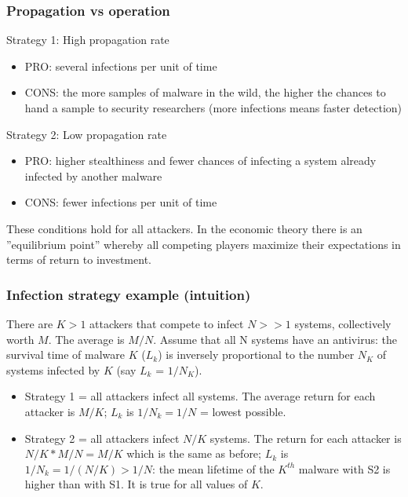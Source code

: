 \documentclass[a4paper, 10pt, titlepage]{article}
\begin{document}
\subsubsection*{Propagation vs operation}
Strategy 1: High propagation rate
\begin{itemize}
	\item PRO: several infections per unit of time
	\item CONS: the more samples of malware in the wild, the higher the
	chances to hand a sample to security researchers (more infections means faster detection)
\end{itemize}
Strategy 2: Low propagation rate
\begin{itemize}
	\item PRO: higher stealthiness and fewer chances of infecting a system already infected by another malware
	\item CONS: fewer infections per unit of time
\end{itemize}
These conditions hold for all attackers. In the economic theory there is an ”equilibrium point” whereby all competing players maximize their expectations in terms of return to investment.

\subsubsection*{Infection strategy example (intuition)}
There are $K>1$ attackers that compete to infect $N>>1$ systems, collectively worth $M$. The average is $M/N$. Assume that all N systems have an antivirus: the survival time of malware $K$ ($L_k$) is inversely proportional to the number $N_K$ of systems infected by $K$ (say $L_k$ = $1/N_K$).
\begin{itemize}
	\item Strategy 1 = all attackers infect all systems. The average return for each attacker is $M/K$; $L_k$ is $1/N_k =1/N$ = lowest possible.
	\item Strategy 2 = all attackers infect $N/K$ systems. The return for each attacker is $N/K*M/N=M/K$ which is the same as before; $L_k$ is $1/N_k = 1/(N/K) > 1/N$: the mean lifetime of the $K^{th}$ malware with S2 is higher than with S1. It is true for all values of $K$.
\end{itemize}
\end{document}
